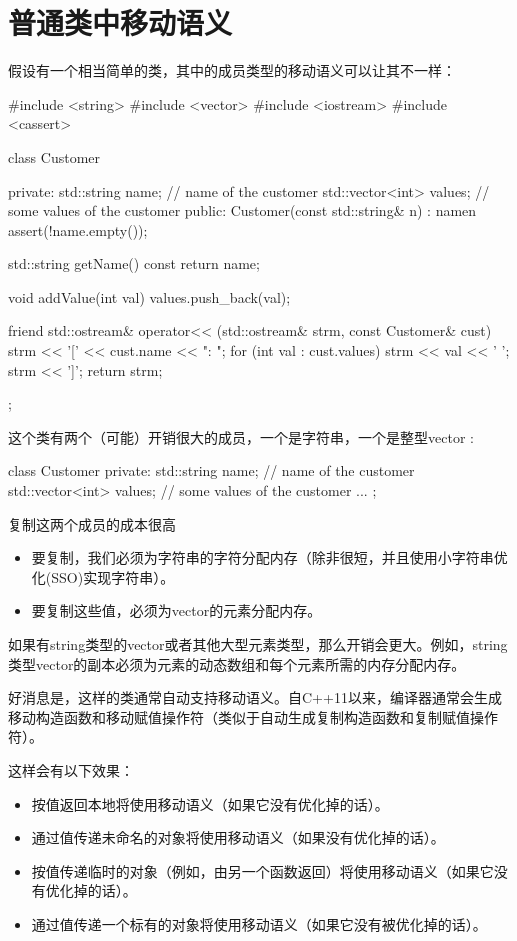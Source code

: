 \section{普通类中移动语义}
假设有一个相当简单的类，其中的成员类型的移动语义可以让其不一样：

\begin{cppcode}
#include <string>
#include <vector>
#include <iostream>
#include <cassert>

class Customer {
private:
	std::string name; // name of the customer
	std::vector<int> values; // some values of the customer
public:
	Customer(const std::string& n)
	: name{n} {
		assert(!name.empty());
	}

	std::string getName() const {
		return name;
	}

	void addValue(int val) {
		values.push_back(val);
	}

	friend std::ostream& operator<< (std::ostream& strm, const Customer& cust) {
		strm << '[' << cust.name << ": ";
		for (int val : cust.values) {
			strm << val << ' ';
		}
		strm << ']';
		return strm;
	}
};
\end{cppcode}

这个类有两个（可能）开销很大的成员，一个是字符串，一个是整型vector :

\begin{cppcode}
class Customer {
private:
	std::string name; // name of the customer
	std::vector<int> values; // some values of the customer
	...
};
\end{cppcode}

复制这两个成员的成本很高

\begin{itemize}
	\item 要复制，我们必须为字符串的字符分配内存（除非很短，并且使用小字符串优化(SSO)实现字符串）。
	\item 要复制这些值，必须为vector的元素分配内存。
\end{itemize}

如果有string类型的vector或者其他大型元素类型，那么开销会更大。例如，string类型vector的副本必须为元素的动态数组和每个元素所需的内存分配内存。

好消息是，这样的类通常自动支持移动语义。自C++11以来，编译器通常会生成移动构造函数和移动赋值操作符（类似于自动生成复制构造函数和复制赋值操作符）。

这样会有以下效果：

\begin{itemize}
	\item 按值返回本地将使用移动语义（如果它没有优化掉的话）。
	\item 通过值传递未命名的对象将使用移动语义（如果没有优化掉的话）。
	\item 按值传递临时的对象（例如，由另一个函数返回）将使用移动语义（如果它没有优化掉的话）。
	\item 通过值传递一个标有的对象将使用移动语义（如果它没有被优化掉的话）。
\end{itemize}


